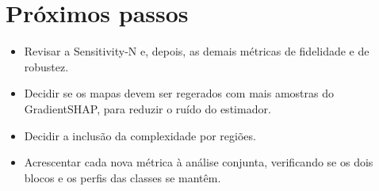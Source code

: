 \documentclass[11pt,a4paper]{article}
\begin{document}
\section{Próximos passos}
\begin{itemize}
    \item Revisar a Sensitivity-N e, depois, as demais métricas de fidelidade e de robustez.
    \item Decidir se os mapas devem ser regerados com mais amostras do GradientSHAP, para reduzir o ruído do estimador.
    \item Decidir a inclusão da complexidade por regiões.
    \item Acrescentar cada nova métrica à análise conjunta, verificando se os dois blocos e os perfis das classes se mantêm.
\end{itemize}
\end{document}
